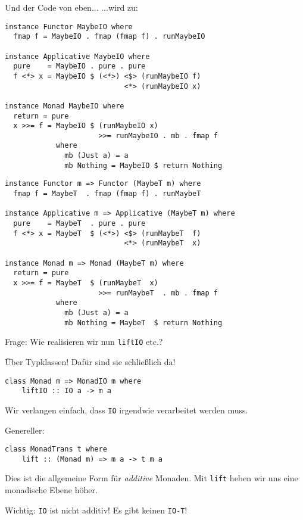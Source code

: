 \documentclass{beamer}
\begin{document}
\begin{frame}[fragile]
\begin{overprint}
Und der Code von eben...
...wird zu:
\end{overprint}
\begin{overprint}
\begin{verbatim}
instance Functor MaybeIO where
  fmap f = MaybeIO . fmap (fmap f) . runMaybeIO

instance Applicative MaybeIO where
  pure    = MaybeIO . pure . pure
  f <*> x = MaybeIO $ (<*>) <$> (runMaybeIO f)
                            <*> (runMaybeIO x)

instance Monad MaybeIO where
  return = pure
  x >>= f = MaybeIO $ (runMaybeIO x)
                      >>= runMaybeIO . mb . fmap f
            where
              mb (Just a) = a
              mb Nothing = MaybeIO $ return Nothing
\end{verbatim}
\begin{verbatim}
instance Functor m => Functor (MaybeT m) where
  fmap f = MaybeT  . fmap (fmap f) . runMaybeT

instance Applicative m => Applicative (MaybeT m) where
  pure    = MaybeT  . pure . pure
  f <*> x = MaybeT  $ (<*>) <$> (runMaybeT  f)
                            <*> (runMaybeT  x)

instance Monad m => Monad (MaybeT m) where
  return = pure
  x >>= f = MaybeT  $ (runMaybeT  x)
                      >>= runMaybeT  . mb . fmap f
            where
              mb (Just a) = a
              mb Nothing = MaybeT  $ return Nothing
\end{verbatim}
\end{overprint}
\end{frame}

\begin{frame}[fragile]
Frage: Wie realisieren wir nun \texttt{liftIO} etc.?\bigskip

\pause
Über Typklassen! Dafür sind sie schließlich da! \smallskip
\begin{verbatim}
class Monad m => MonadIO m where
    liftIO :: IO a -> m a
\end{verbatim}
Wir verlangen einfach, dass \texttt{IO} irgendwie verarbeitet werden muss.\bigskip

\pause
Genereller:\smallskip

\begin{verbatim}
class MonadTrans t where
    lift :: (Monad m) => m a -> t m a
\end{verbatim}
\pause
\smallskip

Dies ist die allgemeine Form für \emph{additive} Monaden. Mit \texttt{lift} heben wir uns eine monadische Ebene höher.
\pause
\begin{important}
Wichtig: \texttt{IO} ist nicht additiv! Es gibt keinen \texttt{IO-T}!
\end{important}
\end{frame}
\end{document}

